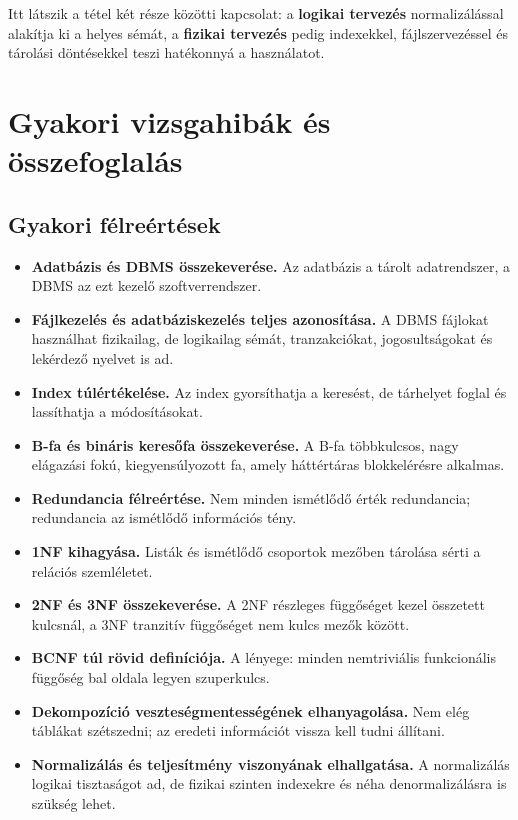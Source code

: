 Itt látszik a tétel két része közötti kapcsolat: a \textbf{logikai tervezés} normalizálással alakítja ki a helyes sémát, a \textbf{fizikai tervezés} pedig indexekkel, fájlszervezéssel és tárolási döntésekkel teszi hatékonnyá a használatot.

\section{Gyakori vizsgahibák és összefoglalás}

\subsection{Gyakori félreértések}

\begin{itemize}
  \item \textbf{Adatbázis és DBMS összekeverése.} Az adatbázis a tárolt adatrendszer, a DBMS az ezt kezelő szoftverrendszer.
  \item \textbf{Fájlkezelés és adatbáziskezelés teljes azonosítása.} A DBMS fájlokat használhat fizikailag, de logikailag sémát, tranzakciókat, jogosultságokat és lekérdező nyelvet is ad.
  \item \textbf{Index túlértékelése.} Az index gyorsíthatja a keresést, de tárhelyet foglal és lassíthatja a módosításokat.
  \item \textbf{B-fa és bináris keresőfa összekeverése.} A B-fa többkulcsos, nagy elágazási fokú, kiegyensúlyozott fa, amely háttértáras blokkelérésre alkalmas.
  \item \textbf{Redundancia félreértése.} Nem minden ismétlődő érték redundancia; redundancia az ismétlődő információs tény.
  \item \textbf{1NF kihagyása.} Listák és ismétlődő csoportok mezőben tárolása sérti a relációs szemléletet.
  \item \textbf{2NF és 3NF összekeverése.} A 2NF részleges függőséget kezel összetett kulcsnál, a 3NF tranzitív függőséget nem kulcs mezők között.
  \item \textbf{BCNF túl rövid definíciója.} A lényege: minden nemtriviális funkcionális függőség bal oldala legyen szuperkulcs.
  \item \textbf{Dekompozíció veszteségmentességének elhanyagolása.} Nem elég táblákat szétszedni; az eredeti információt vissza kell tudni állítani.
  \item \textbf{Normalizálás és teljesítmény viszonyának elhallgatása.} A normalizálás logikai tisztaságot ad, de fizikai szinten indexekre és néha denormalizálásra is szükség lehet.
\end{itemize}

